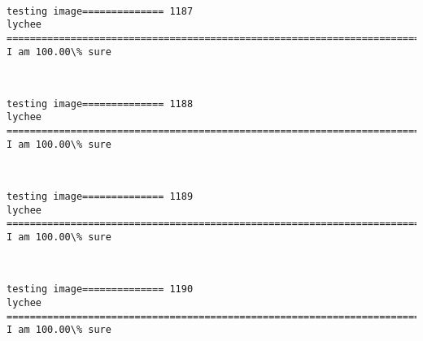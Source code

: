 \documentclass[11pt]{article}
\begin{document}
    \begin{center}
    \end{center}
    { \hspace*{\fill} \\}
    
    \begin{Verbatim}[commandchars=\\\{\}]
testing image============== 1187
lychee
============================================================================
I am 100.00\% sure

    \end{Verbatim}

    \begin{center}
    \end{center}
    { \hspace*{\fill} \\}
    
    \begin{Verbatim}[commandchars=\\\{\}]
testing image============== 1188
lychee
============================================================================
I am 100.00\% sure

    \end{Verbatim}

    \begin{center}
    \end{center}
    { \hspace*{\fill} \\}
    
    \begin{Verbatim}[commandchars=\\\{\}]
testing image============== 1189
lychee
============================================================================
I am 100.00\% sure

    \end{Verbatim}

    \begin{center}
    \end{center}
    { \hspace*{\fill} \\}
    
    \begin{Verbatim}[commandchars=\\\{\}]
testing image============== 1190
lychee
============================================================================
I am 100.00\% sure

    \end{Verbatim}
\end{document}
